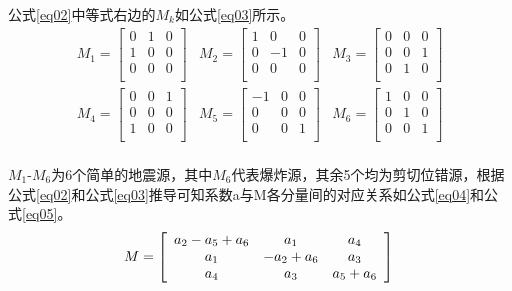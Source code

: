 公式\ref{eq02}中等式右边的$M_k$如公式\ref{eq03}所示。
\begin{equation}
\label{eq03}
\begin{array}{ccc}
M_1=\left[\begin{array}{ccc}
0 & 1 & 0\\
1 & 0 & 0\\
0 & 0 & 0\\
\end{array}\right]&
M_2=\left[\begin{array}{ccc}
1 & 0 & 0\\
0 & -1 & 0\\
0 & 0 & 0\\
\end{array}\right]&
M_3=\left[\begin{array}{ccc}
0 & 0 & 0\\
0 & 0 & 1\\
0 & 1 & 0\\
\end{array}\right]\\
M_4=\left[\begin{array}{ccc}
0 & 0 & 1\\
0 & 0 & 0\\
1 & 0 & 0\\
\end{array}\right]&
M_5=\left[\begin{array}{ccc}
-1 & 0 & 0\\
0 & 0 & 0\\
0 & 0 & 1\\
\end{array}\right]&
M_6=\left[\begin{array}{ccc}
1 & 0 & 0\\
0 & 1 & 0\\
0 & 0 & 1\\
\end{array}\right]\\
\end{array}
\end{equation}

$M_1$-$M_6$为6个简单的地震源，其中$M_6$代表爆炸源，其余5个均为剪切位错源，根据公式\ref{eq02}和公式\ref{eq03}推导可知系数a与M各分量间的对应关系如公式\ref{eq04}和公式\ref{eq05}。
\begin{equation}
\label{eq04}
M=\left[\begin{array}{ccc}
a_2-a_5+a_6 & a_1 & a_4\\
a_1 & -a_2+a_6 & a_3\\
a_4 & a_3 & a_5+a_6\\
\end{array}\right]\\
\end{equation}

